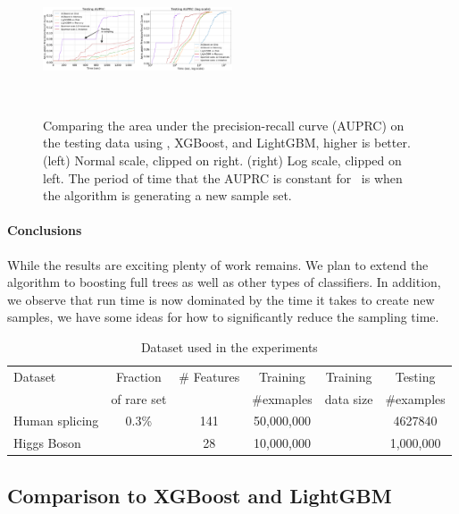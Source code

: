 \begin{figure}[t]
    \centering
    \includegraphics[width=0.5\textwidth]{figs/splice-auprc.png}
    \caption{Comparing the area under the precision-recall curve (AUPRC) on the testing data
    using \Sparrow, XGBoost, and LightGBM, higher is better.
    (left) Normal scale, clipped on right.
    (right) Log scale, clipped on left.
    The period of time that the AUPRC is constant for \Sparrow\ is when the algorithm is generating a new sample set.}~\label{fig:auprc}
\end{figure}


\paragraph{Conclusions}
While the results are exciting plenty of work remains. We plan to
extend the algorithm to boosting full trees as well as other types of
classifiers.
In addition, we observe that run time is now dominated by the time it
takes to create new samples, we have some ideas for how to
significantly reduce the sampling time.





\iffalse

\begin{table}[h]
\centering
\caption{Dataset used in the experiments}\label{tab:dataset}
\begin{tabular}{|l|ccccc|}
\cline{1-6}
Dataset         & Fraction    & \# Features & Training    &  Training  & Testing     \\
                & of rare set &             & \#exmaples  &  data size & \#examples  \\ \cline{1-6}
Human splicing  & 0.3\%       & 141         & 50,000,000  &            & 4627840     \\ \cline{1-6}
Higgs Boson     &             & 28          & 10,000,000  &            & 1,000,000   \\ \cline{1-6}
\end{tabular}
\end{table}

\subsection{Comparison to XGBoost and LightGBM}


